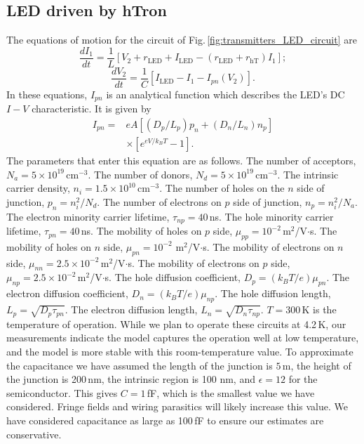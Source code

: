 \documentclass[twocolumn]{article}
\begin{document}
\subsection{LED driven by hTron}
The equations of motion for the circuit of Fig.\,\ref{fig:transmitters_LED_circuit} are
\begin{equation}
\label{eq:ledDrivenByHTron_equationOfMotion01}
\frac{dI_1}{dt} = \frac{1}{L}\left[V_2+r_{\mathrm{LED}}+I_{\mathrm{LED}}-(r_{\mathrm{LED}}+r_{\mathrm{hT}})I_1\right];
\end{equation}
\begin{equation}
\label{eq:ledDrivenByHTron_equationOfMotion02}
\frac{dV_2}{dt} = \frac{1}{C}[I_{\mathrm{LED}}-I_1-I_{pn}(V_2)].
\end{equation} 
In these equations, $I_{pn}$ is an analytical function which describes the LED's DC $I-V$ characteristic. It is given by \cite{stba2006}
\begin{equation}
\label{eq:ledDrivenByHTron_ledModel}
\begin{split}
I_{pn} = & eA\left[ (D_p/L_p)p_n + (D_n/L_n)n_p \right] \\
& \times\left[ e^{eV/k_BT} - 1 \right].
\end{split}
\end{equation}
The parameters that enter this equation are as follows. The number of acceptors, $N_a = 5\times 10^{19}$\,cm$^{-3}$. The number of donors, $N_d = 5\times 10^{19}$\,cm$^{-3}$. The intrinsic carrier density, $n_i = 1.5\times 10^{10}$\,cm$^{-3}$. The number of holes on the $n$ side of junction, $p_n = n_i^2/N_d$. The number of electrons on $p$ side of junction, $n_p = n_i^2/N_a$. The electron minority carrier lifetime, $\tau_{np} = 40$\,ns. The hole minority carrier lifetime, $\tau_{pn} = 40$\,ns. The mobility of holes on $p$ side, $\mu_{pp} = 10^{-2}$\,m$^2$/V$\cdot$s. The mobility of holes on $n$ side, $\mu_{pn}= 10^{-2}$ m$^2$/V$\cdot$s. The mobility of electrons on $n$ side, $\mu_{nn} =  2.5\times10^{-2}$\,m$^2$/V$\cdot$s. The mobility of electrons on $p$ side, $\mu_{np} = 2.5\times 10^{-2}$\,m$^2$/V$\cdot$s. The hole diffusion coefficient, $D_p = (k_BT/e)\mu_{pn}$. The electron diffusion coefficient, $D_n = (k_BT/e)\mu_{np}$. The hole diffusion length, $L_p = \sqrt{D_p\tau_{pn}}$. The electron diffusion length, $L_n = \sqrt{D_n\tau_{np}}$. $T = 300$\,K is the temperature of operation. While we plan to operate these circuits at 4.2\,K, our measurements indicate the model captures the operation well at low temperature, and the model is more stable with this room-temperature value. To approximate the capacitance we have assumed the length of the junction is $5$\,\textmu m, the height of the junction is 200\,nm, the intrinsic region is 100 nm, and $\epsilon = 12$ for the semiconductor. This gives $C = 1$\,fF, which is the smallest value we have considered. Fringe fields and wiring parasitics will likely increase this value. We have considered capacitance as large as 100\,fF to ensure our estimates are conservative.
\end{document}
